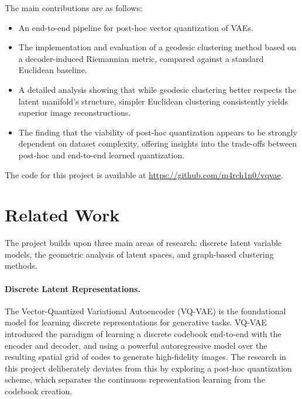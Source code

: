 \documentclass{article}
\begin{document}
The main contributions are as follows:
\begin{itemize}
    \item An end-to-end pipeline for post-hoc vector quantization of VAEs.
    \item The implementation and evaluation of a geodesic clustering method based on a decoder-induced Riemannian metric, compared against a standard Euclidean baseline.
    \item A detailed analysis showing that while geodesic clustering better respects the latent manifold's structure, simpler Euclidean clustering consistently yields superior image reconstructions.
    \item The finding that the viability of post-hoc quantization appears to be strongly dependent on dataset complexity, offering insights into the trade-offs between post-hoc and end-to-end learned quantization.
\end{itemize}

The code for this project is available at \url{https://github.com/m4rch1n0/vqvae}.

\section{Related Work}
The project builds upon three main areas of research: discrete latent variable models, the geometric analysis of latent spaces, and graph-based clustering methods.

\paragraph{Discrete Latent Representations.} The Vector-Quantized Variational Autoencoder (VQ-VAE) \cite{van2017neural} is the foundational model for learning discrete representations for generative tasks. 
VQ-VAE introduced the paradigm of learning a discrete codebook end-to-end with the encoder and decoder, and using a powerful autoregressive model over the resulting spatial grid of codes to generate high-fidelity images. 
The research in this project deliberately deviates from this by exploring a post-hoc quantization scheme, which separates the continuous representation learning from the codebook creation.
\end{document}
